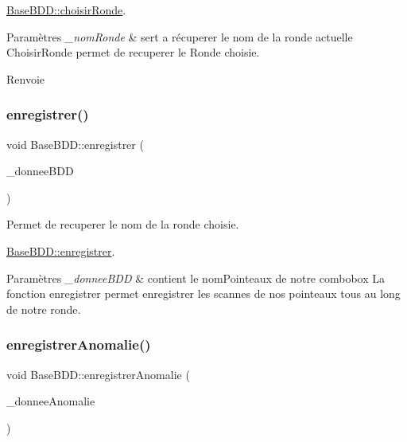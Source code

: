 \hyperlink{class_base_b_d_d_aaf97d5447c9e64403c95458630434b7a}{Base\+B\+D\+D\+::choisir\+Ronde}. 


\begin{DoxyParams}{Paramètres}
{\em \+\_\+nom\+Ronde} & sert a récuperer le nom de la ronde actuelle Choisir\+Ronde permet de recuperer le Ronde choisie. \\
\hline
\end{DoxyParams}
\begin{DoxyReturn}{Renvoie}

\end{DoxyReturn}
\mbox{\label{class_base_b_d_d_a90699f331825ff764a578233a45a2d17}} 
\subsubsection{\texorpdfstring{enregistrer()}{enregistrer()}}
{\footnotesize\ttfamily void Base\+B\+D\+D\+::enregistrer (\begin{DoxyParamCaption}\item[{const Q\+String}]{\+\_\+donnee\+B\+DD }\end{DoxyParamCaption})}



Permet de recuperer le nom de la ronde choisie. 

\hyperlink{class_base_b_d_d_a90699f331825ff764a578233a45a2d17}{Base\+B\+D\+D\+::enregistrer}.


\begin{DoxyParams}{Paramètres}
{\em \+\_\+donnee\+B\+DD} & contient le nom\+Pointeaux de notre combobox La fonction enregistrer permet enregistrer les scannes de nos pointeaux tous au long de notre ronde. \\
\hline
\end{DoxyParams}
\mbox{\label{class_base_b_d_d_a9c5f51c11f49e494e608a9dafb635629}} 
\subsubsection{\texorpdfstring{enregistrer\+Anomalie()}{enregistrerAnomalie()}}
{\footnotesize\ttfamily void Base\+B\+D\+D\+::enregistrer\+Anomalie (\begin{DoxyParamCaption}\item[{const Q\+String}]{\+\_\+donnee\+Anomalie }\end{DoxyParamCaption})}



